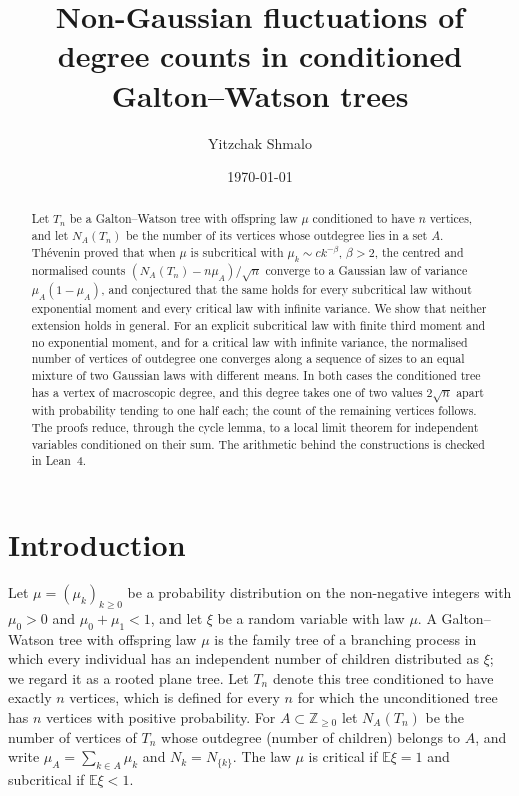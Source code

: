 \documentclass[11pt]{amsart}
\title[Non-Gaussian degree counts in conditioned Galton--Watson trees]{Non-Gaussian fluctuations of degree counts in conditioned Galton--Watson trees}
\author{Yitzchak Shmalo}
\date{\today}
\theoremstyle{definition}
\newcommand{\Z}{\mathbb{Z}}
\newcommand{\E}{\mathbb{E}}
\begin{document}
\begin{abstract}
Let $T_n$ be a Galton--Watson tree with offspring law $\mu$ conditioned to have $n$ vertices, and let $N_A(T_n)$ be the number of its vertices whose outdegree lies in a set $A$. Th\'evenin proved that when $\mu$ is subcritical with $\mu_k\sim ck^{-\beta}$, $\beta>2$, the centred and normalised counts $(N_A(T_n)-n\mu_A)/\sqrt n$ converge to a Gaussian law of variance $\mu_A(1-\mu_A)$, and conjectured that the same holds for every subcritical law without exponential moment and every critical law with infinite variance. We show that neither extension holds in general. For an explicit subcritical law with finite third moment and no exponential moment, and for a critical law with infinite variance, the normalised number of vertices of outdegree one converges along a sequence of sizes to an equal mixture of two Gaussian laws with different means. In both cases the conditioned tree has a vertex of macroscopic degree, and this degree takes one of two values $2\sqrt n$ apart with probability tending to one half each; the count of the remaining vertices follows. The proofs reduce, through the cycle lemma, to a local limit theorem for independent variables conditioned on their sum. The arithmetic behind the constructions is checked in Lean~4.
\end{abstract}

\maketitle

\section{Introduction}

Let $\mu=(\mu_k)_{k\ge0}$ be a probability distribution on the non-negative integers with $\mu_0>0$ and $\mu_0+\mu_1<1$, and let $\xi$ be a random variable with law $\mu$. A Galton--Watson tree with offspring law $\mu$ is the family tree of a branching process in which every individual has an independent number of children distributed as $\xi$; we regard it as a rooted plane tree. Let $T_n$ denote this tree conditioned to have exactly $n$ vertices, which is defined for every $n$ for which the unconditioned tree has $n$ vertices with positive probability. For $A\subset\Z_{\ge0}$ let $N_A(T_n)$ be the number of vertices of $T_n$ whose outdegree (number of children) belongs to $A$, and write $\mu_A=\sum_{k\in A}\mu_k$ and $N_k=N_{\{k\}}$. The law $\mu$ is critical if $\E\xi=1$ and subcritical if $\E\xi<1$.
\end{document}
